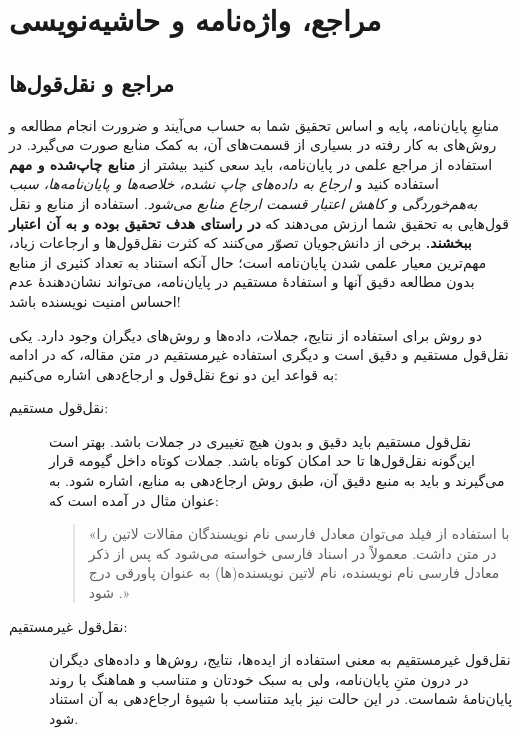 \chapter{مراجع، واژه‌نامه و حاشیه‌نویسی}
\label{app:refMan}

\section{مراجع و نقل‌قول‌ها}
\label{sec:refUsage}
منابعِ پایان‌نامه، پایه و اساس تحقیق شما به حساب می‌آیند و ضرورت انجام مطالعه و روش‌های به کار رفته در بسیاری از قسمت‌های آن، به کمک منابع صورت می‌گیرد. در استفاده از مراجع علمی در پایان‌نامه، باید سعی کنید بیشتر از
\textbf{منابع چاپ‌شده و مهم}
استفاده کنید و
\emph{ارجاع به داده‌های چاپ نشده، خلاصه‌ها و پایان‌نامه‌ها، سبب به‌هم‌خوردگی و کاهش اعتبار قسمت ارجاع منابع می‌شود.}
استفاده از منابع و نقل قول‌هایی به تحقیق شما ارزش می‌دهند که
\textbf{در راستای هدف تحقیق بوده و به آن اعتبار ببخشند.}
برخی از دانش‌جویان تصوّر می‌کنند که کثرت نقل‌قول‌ها و ارجاعات زیاد، مهم‌ترین معیار علمی شدن پایان‌نامه است؛ حال آنکه استناد به تعداد کثیری از منابع بدون مطالعه دقیق آنها و استفادهٔ مستقیم در پایان‌نامه، می‌تواند نشان‌دهندهٔ عدم احساس امنیت نویسنده باشد!

دو روش برای استفاده از نتایج، جملات، داده‌ها و روش‌های دیگران وجود دارد. یکی نقل‌قول مستقیم و دقیق است و دیگری استفاده غیرمستقیم در متن مقاله، که در ادامه به قواعد این دو نوع نقل‌قول و ارجاع‌دهی اشاره می‌کنیم:
\begin{description}
	\item[نقل‌قول مستقیم:]
	      نقل‌قول مستقیم باید دقیق و بدون هیچ تغییری در جملات باشد. بهتر است این‌گونه نقل‌قول‌ها تا حد امکان کوتاه باشد. جملات کوتاه داخل گیومه قرار می‌گیرند و باید به منبع دقیق آن، طبق روش ارجاع‌دهی به منابع، اشاره شود. به عنوان مثال در
	      \cite{persianbib87userguide}
	      آمده است که:
	      \begin{quote}
		      «با استفاده از فیلد
		      می‌توان معادل فارسی نام نویسندگان مقالات لاتین را در متن داشت. معمولاً در اسناد فارسی خواسته می‌شود که پس از ذکر معادل فارسی نام نویسنده، نام لاتین نویسنده(ها) به عنوان پاورقی درج شود
		      \citep{persianbib87userguide}.»
	      \end{quote}
	\item[نقل‌قول غیرمستقیم:]
	      نقل‌قول غیرمستقیم به معنی استفاده از ایده‌ها، نتایج، روش‌ها و داده‌های دیگران در درون متنِ پایان‌نامه، ولی به سبک خودتان و متناسب و هماهنگ با روند پایان‌نامهٔ شماست. در این حالت نیز باید متناسب با شیوهٔ ارجاع‌دهی به آن استناد شود.
\end{description}

